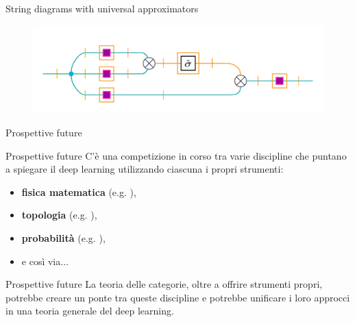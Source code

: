 \documentclass{beamer}
\begin{document}
\begin{frame}{String diagrams with universal approximators}
    \begin{figure}
        \begin{center}
            \includegraphics[width=1\textwidth]{figures/khatri_attention.png}
            \caption*{\cite{khatri2024anatomy}}
        \end{center}
    \end{figure}
\end{frame}

\begin{frame}[standout]
    \huge Prospettive future
\end{frame}

\begin{frame}{Prospettive future}
    C'è una competizione in corso tra varie discipline che puntano a spiegare il deep learning utilizzando ciascuna i propri strumenti:
    \begin{itemize}
        \item<1-> \textbf{fisica matematica} {\footnotesize (e.g. \cite{roberts2022principles})},
        \item<2-> \textbf{topologia} {\footnotesize (e.g. \cite{hensel2021survey})},
        \item<3-> \textbf{probabilità} {\footnotesize (e.g. \cite{patel2015probabilistic})},
        \item<4-> e così via...
    \end{itemize}
    
\end{frame}

\begin{frame}{Prospettive future}
    La teoria delle categorie, oltre a offrire strumenti propri, potrebbe creare un ponte tra queste discipline e potrebbe unificare i loro approcci in una teoria generale del deep learning.
\end{frame}

\begin{frame}[allowframebreaks]
    \printbibliography
\end{frame}
\end{document}
